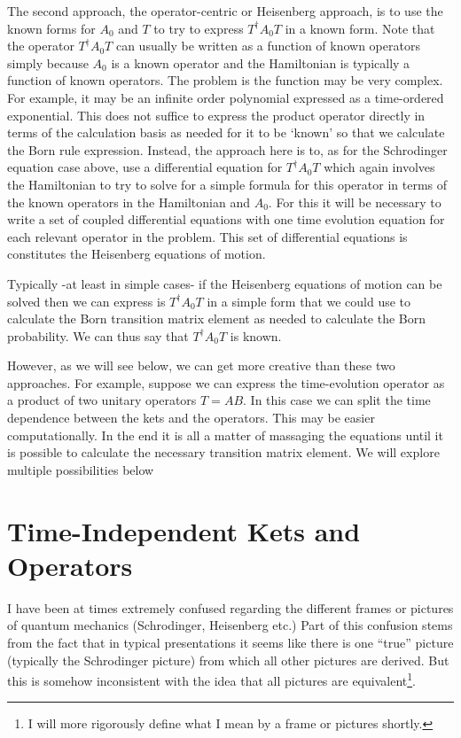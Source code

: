 \documentclass[12pt]{article}
\begin{document}
The second approach, the operator-centric or Heisenberg approach, is to use the known forms for $A_0$ and $T$ to try to express $T^{\dag} A_0 T$ in a known form. Note that the operator $T^{\dag}A_0 T$ can usually be written as a function of known operators simply because $A_0$ is a known operator and the Hamiltonian is typically a function of known operators. The problem is the function may be very complex. For example, it may be an infinite order polynomial expressed as a time-ordered exponential. This does not suffice to express the product operator directly in terms of the calculation basis as needed for it to be `known' so that we calculate the Born rule expression. Instead, the approach here is to, as for the Schrodinger equation case above, use a differential equation for $T^{\dag}A_0 T$ which again involves the Hamiltonian to try to solve for a simple formula for this operator in terms of the known operators in the Hamiltonian and $A_0$. For this it will be necessary to write a set of coupled differential equations with one time evolution equation for each relevant operator in the problem. This set of differential equations is constitutes the Heisenberg equations of motion.

Typically -at least in simple cases- if the Heisenberg equations of motion can be solved then we can express is $T^{\dag}A_0T$ in a simple form that we could use to calculate the Born transition matrix element as needed to calculate the Born probability. We can thus say that $T^{\dag}A_0T$ is known.

However, as we will see below, we can get more creative than these two approaches. For example, suppose we can express the time-evolution operator as a product of two unitary operators $T = AB$. In this case we can split the time dependence between the kets and the operators. This may be easier computationally. In the end it is all a matter of massaging the equations until it is possible to calculate the necessary transition matrix element. We will explore multiple possibilities below


\section{Time-Independent Kets and Operators}


I have been at times extremely confused regarding the different frames or pictures of quantum mechanics (Schrodinger, Heisenberg etc.) Part of this confusion stems from the fact that in typical presentations it seems like there is one ``true'' picture (typically the Schrodinger picture) from which all other pictures are derived. But this is somehow inconsistent with the idea that all pictures are equivalent\footnote{I will more rigorously define what I mean by a frame or pictures shortly.}.
\end{document}
